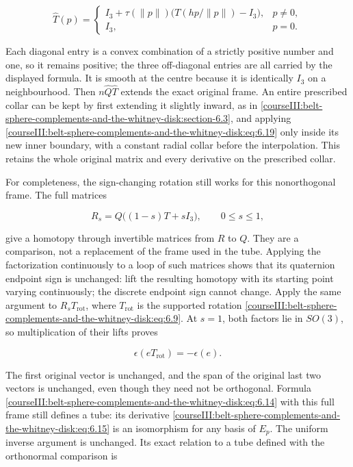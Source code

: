 \begin{equation}
\widehat T(p)=
\begin{cases}
I_3+\tau(\|p\|)
 \bigl(T(hp/\|p\|)-I_3\bigr),&p\ne0,\\
I_3,&p=0.
\end{cases}
\label{courseIII:belt-sphere-complements-and-the-whitney-disk:eq:6.19}
\end{equation}

Each diagonal entry is a convex combination of a strictly positive number and one, so it remains positive; the three off-diagonal entries are all carried by the displayed formula. It is smooth at the centre because it is identically \(I_3\) on a neighbourhood. Then \(n\widehat Q\widehat T\) extends the exact original frame. An entire prescribed collar can be kept by first extending it slightly inward, as in \cref{courseIII:belt-sphere-complements-and-the-whitney-disk:section-6.3}, and applying \eqref{courseIII:belt-sphere-complements-and-the-whitney-disk:eq:6.19} only inside its new inner boundary, with a constant radial collar before the interpolation. This retains the whole original matrix and every derivative on the prescribed collar.

For completeness, the sign-changing rotation still works for this nonorthogonal frame. The full matrices

\begin{equation}
R_s=Q\bigl((1-s)T+sI_3\bigr),\qquad 0\leq s\leq1,
\label{courseIII:belt-sphere-complements-and-the-whitney-disk:eq:6.20}
\end{equation}

give a homotopy through invertible matrices from \(R\) to \(Q\). They are a comparison, not a replacement of the frame used in the tube. Applying the factorization continuously to a loop of such matrices shows that its quaternion endpoint sign is unchanged: lift the resulting homotopy with its starting point varying continuously; the discrete endpoint sign cannot change. Apply the same argument to \(R_sT_{\mathrm{rot}}\), where \(T_{\mathrm{rot}}\) is the supported rotation \eqref{courseIII:belt-sphere-complements-and-the-whitney-disk:eq:6.9}. At \(s=1\), both factors lie in \(SO(3)\), so multiplication of their lifts proves

\begin{equation}
\epsilon(eT_{\mathrm{rot}})=-\epsilon(e).
\label{courseIII:belt-sphere-complements-and-the-whitney-disk:eq:6.21}
\end{equation}

The first original vector is unchanged, and the span of the original last two vectors is unchanged, even though they need not be orthogonal. Formula \eqref{courseIII:belt-sphere-complements-and-the-whitney-disk:eq:6.14} with this full frame still defines a tube: its derivative \eqref{courseIII:belt-sphere-complements-and-the-whitney-disk:eq:6.15} is an isomorphism for any basis of \(E_p\). The uniform inverse argument is unchanged. Its exact relation to a tube defined with the orthonormal comparison is

